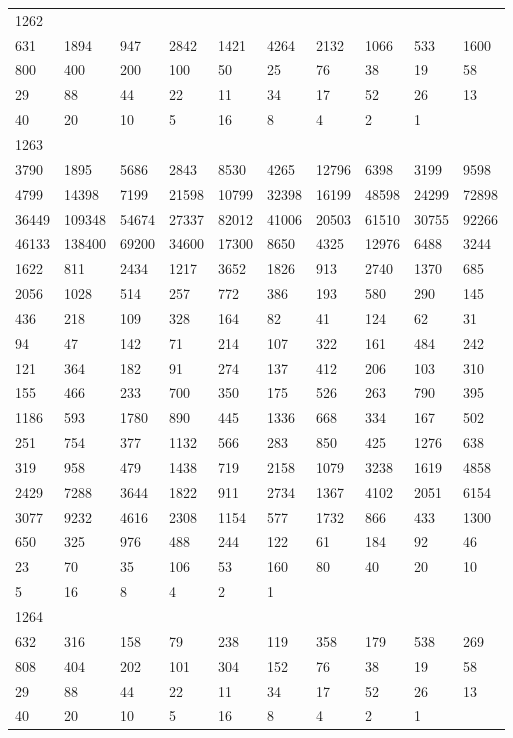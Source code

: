\begin{longtable}{*{10}{l}}
1262&&&&&&&&&\\
631& 1894& 947& 2842& 1421& 4264& 2132& 1066& 533& 1600\\
800& 400& 200& 100& 50& 25& 76& 38& 19& 58\\
29& 88& 44& 22& 11& 34& 17& 52& 26& 13\\
40& 20& 10& 5& 16& 8& 4& 2& 1& \\

1263&&&&&&&&&\\
3790& 1895& 5686& 2843& 8530& 4265& 12796& 6398& 3199& 9598\\
4799& 14398& 7199& 21598& 10799& 32398& 16199& 48598& 24299& 72898\\
36449& 109348& 54674& 27337& 82012& 41006& 20503& 61510& 30755& 92266\\
46133& 138400& 69200& 34600& 17300& 8650& 4325& 12976& 6488& 3244\\
1622& 811& 2434& 1217& 3652& 1826& 913& 2740& 1370& 685\\
2056& 1028& 514& 257& 772& 386& 193& 580& 290& 145\\
436& 218& 109& 328& 164& 82& 41& 124& 62& 31\\
94& 47& 142& 71& 214& 107& 322& 161& 484& 242\\
121& 364& 182& 91& 274& 137& 412& 206& 103& 310\\
155& 466& 233& 700& 350& 175& 526& 263& 790& 395\\
1186& 593& 1780& 890& 445& 1336& 668& 334& 167& 502\\
251& 754& 377& 1132& 566& 283& 850& 425& 1276& 638\\
319& 958& 479& 1438& 719& 2158& 1079& 3238& 1619& 4858\\
2429& 7288& 3644& 1822& 911& 2734& 1367& 4102& 2051& 6154\\
3077& 9232& 4616& 2308& 1154& 577& 1732& 866& 433& 1300\\
650& 325& 976& 488& 244& 122& 61& 184& 92& 46\\
23& 70& 35& 106& 53& 160& 80& 40& 20& 10\\
5& 16& 8& 4& 2& 1& \\

1264&&&&&&&&&\\
632& 316& 158& 79& 238& 119& 358& 179& 538& 269\\
808& 404& 202& 101& 304& 152& 76& 38& 19& 58\\
29& 88& 44& 22& 11& 34& 17& 52& 26& 13\\
40& 20& 10& 5& 16& 8& 4& 2& 1& \\


\end{longtable}
